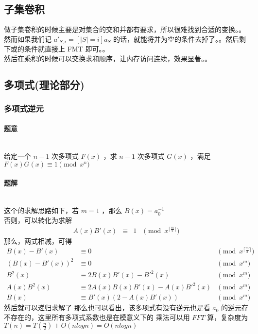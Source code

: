 	\subsection{子集卷积}
	做子集卷积的时候主要是对集合的交和并都有要求，所以很难找到合适的变换。。然而如果我们记 $a'_{S,i}=[|S|=i]a_S$ 的话，就能将并为空的条件去掉了。。然后剩下或的条件就直接上 FMT 即可。。\\
	然后在乘积的时候可以交换求和顺序，让内存访问连续，效果显著。。\\
	\vspace{2cm}
	
	\newpage
	\subsection{多项式(理论部分)}
	\subsubsection{多项式逆元}
	\paragraph{题意}~\\给定一个 $n-1$ 次多项式 $F(x)$ ，求 $n-1$ 次多项式 $G(x)$ ，满足 $F(x)G(x)\equiv 1\pmod{x^n}$
	\paragraph{题解}~\\
	这个的求解思路如下，若 $m=1$ ，那么 $B(x)=a_0^{-1}$\\
	否则，可以转化为求解
	$$
	\begin{aligned}
	A(x)B'(x)&\equiv&1&\pmod{x^{\lceil\frac{m}{2} \rceil }}
	\end{aligned}
	$$
	那么，两式相减，可得
	$$
	\begin{aligned}
	B(x)-B'(x)&\equiv0&\pmod{x^{\lceil\frac{m}{2} \rceil}}\\
	(B(x)-B'(x))^2&\equiv0&\pmod{x^m}\\
	B^2(x)&\equiv2B(x)B'(x)-{B'}^2(x)&\pmod{x^m}\\
	A(x)B^2(x)&\equiv2A(x)B(x)B'(x)-A(x){B'}^2(x)&\pmod{x^m}\\
	B(x)&\equiv B'(x)(2-A(x)B'(x))&\pmod{x^m}
	\end{aligned}
	$$
	然后就可以递归求解了
	那么也可以看出，该多项式有没有逆元也是看 $a_0$ 的逆元存不存在的，这里所有多项式系数也是在模意义下的
	乘法可以用 $FFT$ 算，复杂度为 $T(n)=T(\frac{n}{2})+O(nlogn)=O(nlogn)$\\
	\vspace{1cm}
